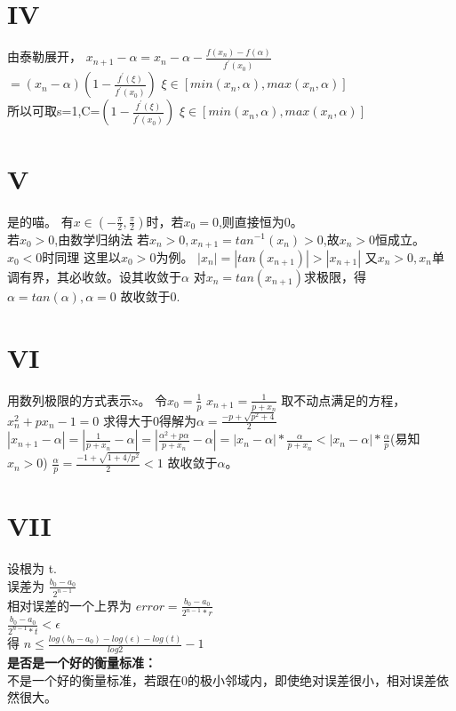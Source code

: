 \documentclass{article}
\begin{document}
\section*{IV}
\begin{flushleft}
  由泰勒展开，
  $x_{n+1}-\alpha=x_n-\alpha-\frac{f(x_n)-f(\alpha)}{f^{'}(x_0)}$\\
  $=(x_n-\alpha)(1-\frac{f^{'}(\xi)}{f^{'}(x_0)})$  $\xi \in [min(x_n,\alpha),max(x_n,\alpha)]$\\
  所以可取s=1,C=$(1-\frac{f^{'}(\xi)}{f^{'}(x_0)})$  $\xi \in [min(x_n,\alpha),max(x_n,\alpha)]$\\
  


\end{flushleft}

\section*{V}
\begin{flushleft}
  是的喵。
  有$x \in (-\frac{\pi}{2},\frac{\pi}{2})$时，若$x_0=0$,则直接恒为0。\\
  若$x_0>0$,由数学归纳法 $若x_n>0,x_{n+1}=tan^{-1}(x_n)>0$,故$x_n>0$恒成立。$x_0<0$时同理
  这里以$x_0>0$为例。
  $|x_n|=|tan(x_{n+1})|>|x_{n+1}|$
  又$x_n>0,{x_n}$单调有界，其必收敛。设其收敛于$\alpha$
  对$x_n=tan(x_{n+1})$求极限，得$\alpha=tan(\alpha),\alpha=0$
  故收敛于0.
\end{flushleft}

\section*{VI}
\begin{flushleft}
  用数列极限的方式表示x。
  令$x_0=\frac{1}{p}$
  $x_{n+1}=\frac{1}{p+x_n}$
  取不动点满足的方程，$x_n^2+px_n-1=0$
  求得大于0得解为$\alpha=\frac{-p+\sqrt{p^2+4}}{2}$
  $|x_{n+1}-\alpha|=|\frac{1}{p+x_n}-\alpha|=|\frac{\alpha^2+p\alpha}{p+x_n}-\alpha|=|x_n-\alpha|*\frac{\alpha}{p+x_n}<|x_n-\alpha|*\frac{\alpha}{p}$(易知$x_n>0$)
  $\frac{\alpha}{p}=\frac{-1+\sqrt{1+4/p^2}}{2}<1$
  故收敛于$\alpha$。

\end{flushleft}

\section*{VII}
\begin{flushleft}
  设根为 t.\\
  误差为  $\frac{b_0-a_0}{2^{n-1}}$\\
  相对误差的一个上界为  $error=\frac{b_0-a_0}{2^{n-1}*r}$\\
  $\frac{b_0-a_0}{2^{n-1}*t}<\epsilon$\\
  得    $n \leq \frac{log(b_0-a_0)-log(\epsilon)-log(t)}{log 2}-1$\\
  \textbf{是否是一个好的衡量标准：}\\
  不是一个好的衡量标准，若跟在0的极小邻域内，即使绝对误差很小，相对误差依然很大。
\end{flushleft}
\end{document}
